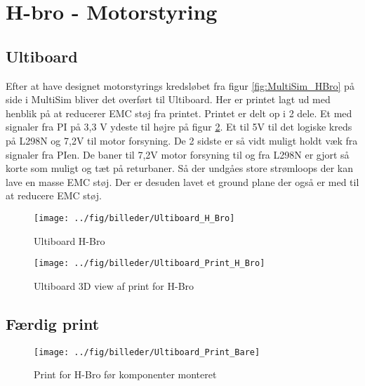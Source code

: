 
\section{H-bro - Motorstyring}





\subsection*{Ultiboard}

Efter at have designet motorstyrings kredsløbet fra figur \ref{fig:MultiSim_HBro} på side \pageref{fig:MultiSim_HBro} i MultiSim bliver det overført til Ultiboard. Her er printet lagt ud med henblik på at reducerer EMC støj fra printet. Printet er delt op i 2 dele. Et med signaler fra PI på 3,3 V ydeste til højre på figur \ref{fig:Ultiboard_Print_H_Bro}. Et til 5V til det logiske kreds på L298N og 7,2V til motor forsyning. De 2 sidste er så vidt muligt holdt væk fra signaler fra PIen. De baner til 7,2V motor forsyning til og fra L298N er gjort så korte som muligt og tæt på returbaner. Så der undgåes store strømloops der kan lave en masse EMC støj. Der er desuden lavet et ground plane der også er med til at reducere EMC støj.

\begin{figure}[h]
	\centering
	\texttt{[image: ../fig/billeder/Ultiboard\_H\_Bro]}
	\label{fig:Ultiboard_H_Bro}
	\caption{Ultiboard H-Bro}
\end{figure}


\begin{figure}[h]
	\centering
	\texttt{[image: ../fig/billeder/Ultiboard\_Print\_H\_Bro]}
	\label{fig:Ultiboard_Print_H_Bro}
	\caption{Ultiboard 3D view af print for H-Bro}
\end{figure}

\clearpage
\subsection*{Færdig print}



\begin{figure}[h]
	\centering
	\texttt{[image: ../fig/billeder/Ultiboard\_Print\_Bare]}
	\label{fig:Ultiboard_Print_H_Bro_Bare}
	\caption{Print for H-Bro før komponenter monteret}
\end{figure}

\clearpage